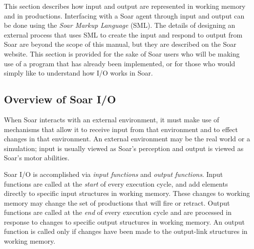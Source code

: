 This section describes how input and output are represented in working memory and in productions. Interfacing with a Soar agent through input and output can be done using the \textit{Soar Markup Language} (SML). The details of designing an external process that uses SML to create the input and respond to output from Soar are beyond the scope of this manual, but they are described  on the Soar website. This section is provided for the sake of Soar users who will be making use of a program that has already been implemented, or for those who would simply like to understand how I/O works in Soar.


\subsection{Overview of Soar I/O}

When Soar interacts with an external environment, it must make use of mechanisms that allow it to receive input from that environment and to effect changes in that environment. An external environment may be the real world or a simulation; input is usually viewed as Soar's perception and output is viewed as Soar's motor abilities.

Soar I/O is accomplished via \emph{input functions} and \emph{output functions}. Input functions are called at the \emph{start} of every execution cycle, and add elements directly to specific input structures in working memory.  These changes to working memory may change the set of productions that will fire or retract. Output functions are called at the \emph{end} of every execution cycle and are processed in response to changes to specific output structures in working memory.  An output function is called only if changes have been made to the output-link structures in working memory.

